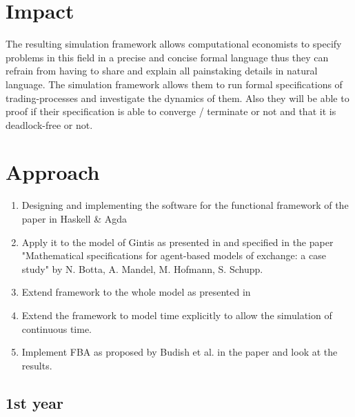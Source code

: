 \documentclass{article}
\begin{document}

\section{Impact}
The resulting simulation framework allows computational economists to specify problems in this field in a precise and concise formal language thus they can refrain from having to share and explain all painstaking details in natural language. The simulation framework allows them to run formal specifications of trading-processes and investigate the dynamics of them. Also they will be able to proof if their specification is able to converge / terminate or not and that it is deadlock-free or not.



\section{Approach}

\begin{enumerate}
\item Designing and implementing the software for the functional framework of the paper \cite{Botta20114025} in Haskell \& Agda
\item Apply it to the model of Gintis as presented in \cite{Gintis2006} and specified in the paper "Mathematical specifications for agent-based models of exchange: a case study" by N. Botta, A. Mandel, M. Hofmann, S. Schupp.
\item Extend framework to the whole model as presented in \cite{gintis_dynamics_2007}
\item Extend the framework to model time explicitly to allow the simulation of continuous time.
\item Implement FBA as proposed by Budish et al. in the paper \cite{Budish2015} and look at the results.
\end{enumerate}

\subsection{1st year}
\end{document}
